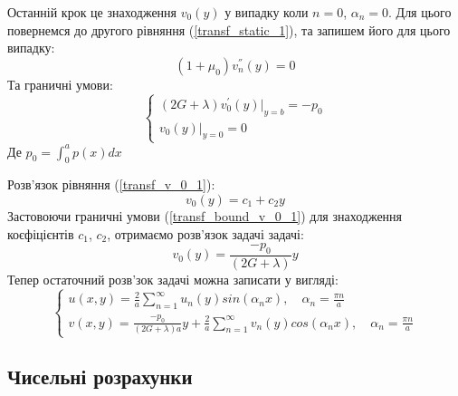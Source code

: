 Останній крок це знаходження $v_0(y)$ у випадку коли $n=0$, $\alpha_n =0$.
Для цього повернемся до другого рівняння (\ref{transf_static_1}), та запишем його для цього випадку:
\begin{equation}\label{transf_v_0_1}
    (1 + \mu_0) v_n^{''}(y) = 0
\end{equation}
Та граничні умови:
\begin{equation}\label{transf_bound_v_0_1}
    \begin{cases}
        (2G + \lambda)v_0^{'}(y)|_{y=b} = -p_0 \\
        v_0(y)|_{y=0} = 0
    \end{cases}
\end{equation}
Де $p_0 = \int_{0}^{a}p(x)dx$

Розв'язок рівняння (\ref{transf_v_0_1}):
\begin{equation}
    v_0(y) = c_1 + c_2 y
\end{equation}
Застовоючи граничні умови (\ref{transf_bound_v_0_1}) для знаходження коєфіцієнтів $c_1$, $c_2$, отримаємо розв'язок задачі задачі:
\begin{equation}
    v_0(y) = \frac{-p_0}{(2G + \lambda)}y
\end{equation}
Тепер остаточний розв'зок задачі можна записати у вигляді:
\begin{equation}
    \begin{cases}
        u(x,y) = \frac{2}{a} \sum_{n=1}^{\infty} u_n(y) sin(\alpha_n x), \quad \alpha_n = \frac{\pi n}{a} \\
        v(x,y) = \frac{-p_0}{(2G + \lambda)a}y + \frac{2}{a} \sum_{n=1}^{\infty} v_n(y) cos(\alpha_n x), \quad \alpha_n = \frac{\pi n}{a}
    \end{cases}
\end{equation}

\subsection{Чисельні розрахунки}
